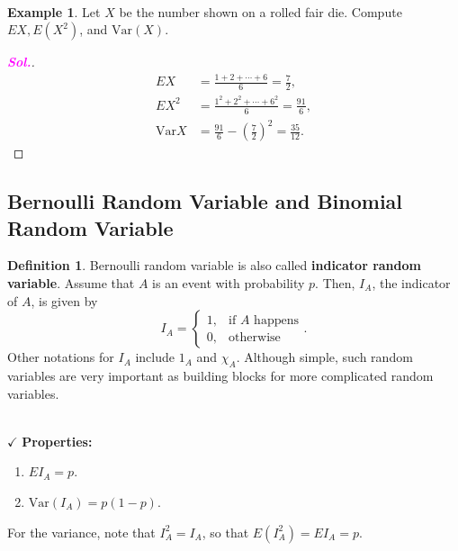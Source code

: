 \documentclass[12pt,a4paper]{article}
\theoremstyle{definition}
\newtheorem{example}{Example}[section]
\theoremstyle{definition}
\newtheorem*{definition}{Definition}
\theoremstyle{definition}
\theoremstyle{definition}
\theoremstyle{remark}
\theoremstyle{definition}
\newcommand{\dispsty}{\displaystyle}
\newcommand{\sol}{\textcolor{magenta}{\bf \textit{Sol.}}\quad}
\newcommand{\Var}{\text{Var}}
\begin{document}
\
\begin{example}
	Let $X$ be the number shown on a rolled fair die. Compute $EX, E(X^2)$, and $\Var(X)$.\begin{proof}[\sol]
		\begin{align*}
		EX &= \frac{1+2+\cdots+6}{6}=\frac{7}{2},\\
		EX^2 &= \frac{1^2+2^2+\cdots+6^2}{6}=\frac{91}{6},\\
		\Var X &= \frac{91}{6}-\left(\frac{7}{2}\right)^2=\frac{35}{12}.
		\end{align*}
	\end{proof}
\end{example}

\subsection{Bernoulli Random Variable and Binomial Random Variable}
\begin{tcolorbox}[colback=white]
	\begin{definition}
		Bernoulli random variable is also called \textbf{indicator random variable}. Assume that $A$ is an event with probability $p$. Then, $I_A$, the indicator of $A$, is given by \[
		I_A=\begin{cases*}
		1, &\text{if $A$ happens}\\
		0, &\text{otherwise}
		\end{cases*}.
		\] Other notations for $I_A$ include $1_A$ and $\chi_A$. Although simple, such random variables are very important as building blocks for more complicated random variables.
	\end{definition}
\end{tcolorbox}\
\\
$\checkmark$ \textbf{Properties:}\begin{enumerate}
\item $\dispsty EI_A=p$.
\item $\dispsty \Var(I_A)=p(1-p)$.
\end{enumerate} For the variance, note that $I_A^2=I_A$, so that $E(I_A^2)=EI_A=p$.\\
\end{document}
